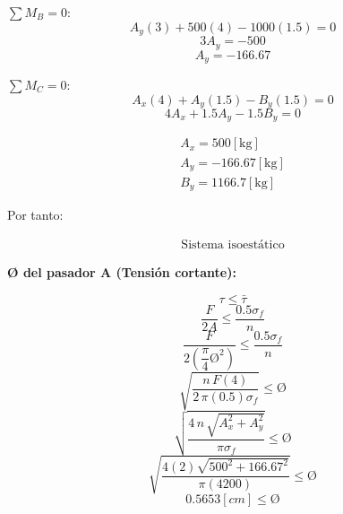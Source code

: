 \documentclass[letter,10pt,twoside]{article}
\begin{document}
$\sum{M_B} = 0$:
\begin{equation*}
    A_y (3) + 500 (4) - 1000(1.5) = 0
\end{equation*}
\begin{equation*}
    3 A_y = -500
\end{equation*}
\begin{equation*}
    A_y = -166.67
\end{equation*}

$\sum{M_C} = 0$:
\begin{equation*}
    A_x (4) + A_y (1.5) - B_y (1.5) = 0
\end{equation*}
\begin{equation*}
    4 A_x + 1.5 A_y - 1.5 B_y = 0
\end{equation*}

\begin{equation*}
\boxed{
    \begin{array}{l}
        A_x = 500[\text{kg}] \\
        A_y = -166.67[\text{kg}] \\
        B_y = 1166.7[\text{kg}]
    \end{array}
}
\end{equation*}

Por tanto:

\begin{equation*}
\boxed{
    \begin{array}{l}
        \text{Sistema isoestático}
    \end{array}
}
\end{equation*}

\textbf{{\O} del pasador A (Tensión cortante):}

\begin{equation*}
    \tau \le \bar{\tau}
\end{equation*}
\begin{equation*}
    \frac{F}{2A} \le \frac{0.5 \sigma_f}{n}
\end{equation*}
\begin{equation*}
    \frac{F}{2(\dfrac{\pi}{4} \text{\O}^2)} \le \frac{0.5 \sigma_f}{n}
\end{equation*}
\begin{equation*}
    \sqrt{\frac{n\,F(4)}{2\,\pi(0.5)\sigma_f}} \le \text{\O}
\end{equation*}
\begin{equation*}
    \sqrt{\frac{4\,n\,\sqrt{A_x^2 + A_y^2}}{\pi\sigma_f}} \le \text{\O}
\end{equation*}
\begin{equation*}
    \sqrt{\frac{4(2)\sqrt{500^2 + 166.67^2}}{\pi(4200)}} \le \text{\O}
\end{equation*}
\begin{equation*}
    0.5653[cm] \le \text{\O}
\end{equation*}
\end{document}
